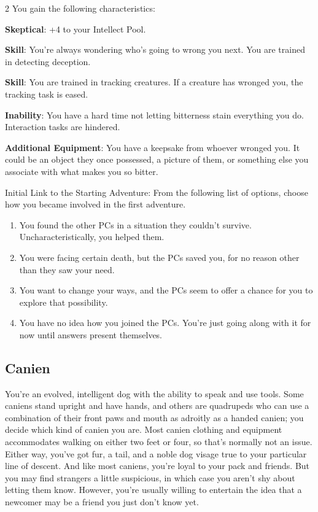 \begin{multicols}{2}
You gain the following characteristics:

\textbf{Skeptical}: +4 to your Intellect Pool.

\textbf{Skill}: You’re always wondering who’s going to wrong you next. You are trained in detecting deception.

\textbf{Skill}: You are trained in tracking creatures. If a creature has wronged you, the tracking task is eased.

\textbf{Inability}: You have a hard time not letting bitterness stain everything you do. Interaction tasks are hindered.

\textbf{Additional Equipment}: You have a keepsake from whoever wronged you. It could be an object they once possessed, a picture of them, or something else you associate with what makes you so bitter.

Initial Link to the Starting Adventure: From the following list of options, choose how you became involved in the first adventure.
\begin{enumerate}
\item  You found the other PCs in a situation they couldn’t survive. Uncharacteristically, you helped them.
\item  You were facing certain death, but the PCs saved you, for no reason other than they saw your need.
\item  You want to change your ways, and the PCs seem to offer a chance for you to explore that possibility.
\item  You have no idea how you joined the PCs. You’re just going along with it for now until answers present themselves.
\end{enumerate}

\subsection{Canien}

You’re an evolved, intelligent dog with the ability to speak and use tools. Some caniens stand upright and have hands, and others are quadrupeds who can use a combination of their front paws and mouth as adroitly as a handed canien; you decide which kind of canien you are. Most canien clothing and equipment accommodates walking on either two feet or four, so that’s normally not an issue. Either way, you’ve got fur, a tail, and a noble dog visage true to your particular line of descent. And like most caniens, you’re loyal to your pack and friends. But you may find strangers a little suspicious, in which case you aren’t shy about letting them know. However, you’re usually willing to entertain the idea that a newcomer may be a friend you just don’t know yet.


\end{multicols}
